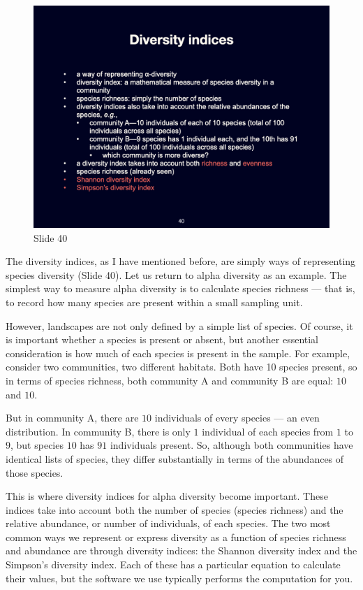 \documentclass[
  10pt,
]{book}
\begin{document}
\begin{figure}[ht]
\centering
\includegraphics[width=0.8\linewidth]{../images/BDC334/BDC334-040.jpeg}
\caption*{Slide 40}
\end{figure}

The diversity indices, as I have mentioned before, are simply ways of
representing species diversity (Slide 40). Let us return to alpha
diversity as an example. The simplest way to measure alpha diversity is
to calculate species richness --- that is, to record how many species
are present within a small sampling unit.

However, landscapes are not only defined by a simple list of species. Of
course, it is important whether a species is present or absent, but
another essential consideration is how much of each species is present
in the sample. For example, consider two communities, two different
habitats. Both have 10 species present, so in terms of species richness,
both community A and community B are equal: \(10\) and \(10\).

But in community A, there are \(10\) individuals of every species --- an
even distribution. In community B, there is only \(1\) individual of
each species from \(1\) to \(9\), but species \(10\) has \(91\)
individuals present. So, although both communities have identical lists
of species, they differ substantially in terms of the abundances of
those species.

This is where diversity indices for alpha diversity become important.
These indices take into account both the number of species (species
richness) and the relative abundance, or number of individuals, of each
species. The two most common ways we represent or express diversity as a
function of species richness and abundance are through diversity
indices: the Shannon diversity index and the Simpson's diversity index.
Each of these has a particular equation to calculate their values, but
the software we use typically performs the computation for you.
\end{document}
